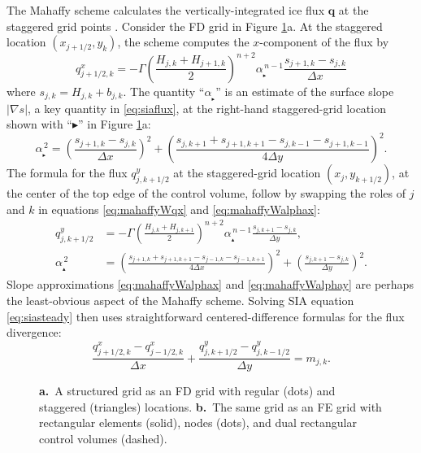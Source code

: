 \documentclass[11pt]{amsart}
\newcommand\bq{\mathbf{q}}
\newcommand{\grad}{\nabla}
\newcommand\alpharight{\alpha_{{}_{\blacktriangleright}}}
\newcommand\alphaup{\alpha_{{\!}_{\blacktriangle}}}
\begin{document}
The Mahaffy scheme calculates the vertically-integrated ice flux $\bq$ at the staggered grid points \cite[equations (19), (20)]{Mahaffy1976}.  Consider the FD grid in Figure \ref{fig:fdfemgrids}a.  At the staggered location $(x_{j+1/2},y_k)$, the scheme computes the $x$-component of the flux by
\begin{equation}
q^x_{j+1/2,k} = - \Gamma \left(\frac{H_{j,k} + H_{j+1,k}}{2}\right)^{n+2} \alpharight^{\,n-1} \frac{s_{j+1,k} - s_{j,k}}{\Delta x}  \label{eq:mahaffyWqx}
\end{equation}
where $s_{j,k} = H_{j,k} + b_{j,k}$.  The quantity ``$\alpharight$\!'' is an estimate of the surface slope $|\grad s|$, a key quantity in \eqref{eq:siaflux}, at the right-hand staggered-grid location shown with ``$\blacktriangleright$'' in Figure \ref{fig:fdfemgrids}a:
\begin{equation}
\alpharight^{\,2} = \left(\frac{s_{j+1,k} - s_{j,k}}{\Delta x}\right)^2 + \left(\frac{s_{j,k+1} + s_{j+1,k+1} - s_{j,k-1} - s_{j+1,k-1}}{4 \Delta y}\right)^2.  \label{eq:mahaffyWalphax}
\end{equation}
The formula for the flux $q^y_{j,k+1/2}$ at the staggered-grid location $(x_j,y_{k+1/2})$, at the center of the top edge of the control volume, follow by swapping the roles of $j$ and $k$ in equations \eqref{eq:mahaffyWqx} and \eqref{eq:mahaffyWalphax}:
\begin{align}
q^y_{j,k+1/2} &= - \Gamma \left(\frac{H_{j,k} + H_{j,k+1}}{2}\right)^{n+2} \alphaup^{\,n-1} \frac{s_{j,k+1} - s_{j,k}}{\Delta y}, \label{eq:mahaffyWqy} \\
\alphaup^{\,2} &= \left(\frac{s_{j+1,k} + s_{j+1,k+1} - s_{j-1,k} - s_{j-1,k+1}}{4 \Delta x}\right)^2 + \left(\frac{s_{j,k+1} - s_{j,k}}{\Delta y}\right)^2.  \label{eq:mahaffyWalphay}
\end{align}
Slope approximations \eqref{eq:mahaffyWalphax} and \eqref{eq:mahaffyWalphay} are perhaps the least-obvious aspect of the Mahaffy scheme.  Solving SIA equation \eqref{eq:siasteady} then uses straightforward centered-difference formulas \cite{MortonMayers2005} for the flux divergence:
\begin{equation}
\frac{q^x_{j+1/2,k} - q^x_{j-1/2,k}}{\Delta x} + \frac{q^y_{j,k+1/2}- q^y_{j,k-1/2}}{\Delta y} = m_{j,k}.  \label{eq:siasteadyfd}
\end{equation}

\begin{figure}[ht]
\begin{center}
 \quad 
\end{center}
\caption{{\large \textbf{a.}}~A structured grid as an FD grid with regular (dots) and staggered (triangles) locations.  {\large \textbf{b.}}~The same grid as an FE grid with rectangular elements (solid), nodes (dots), and dual rectangular control volumes (dashed).}
\label{fig:fdfemgrids}
\end{figure}
\end{document}
